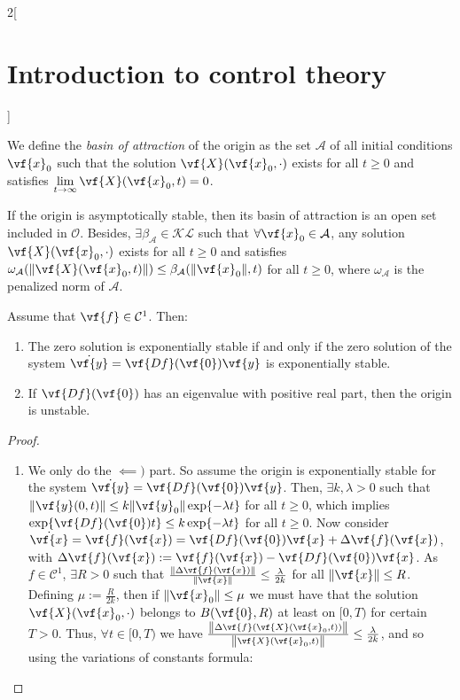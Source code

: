 \documentclass[../../../main_math.tex]{subfiles}
\begin{document}
\begin{multicols}{2}[\section{Introduction to control theory}]
\begin{definition}
    We define the \emph{basin of attraction} of the origin as the set $\mathcal{A}$ of all initial conditions $\vf{x}_0$ such that the solution $\vf{X}(\vf{x}_0, \cdot)$ exists for all $t\geq 0$ and satisfies $\displaystyle\lim_{t\to\infty}\vf{X}(\vf{x}_0, t)=0$.
  \end{definition}
  \begin{theorem}
    If the origin is asymptotically stable, then its basin of attraction is an open set included in $\mathcal{O}$. Besides, $\exists \beta_\mathcal{A}\in \mathcal{KL}$ such that $\forall \vf{x}_0\in\mathcal{A}$, any solution $\vf{X}(\vf{x}_0, \cdot)$ exists for all $t\geq 0$ and satisfies $\omega_{\mathcal{A}}(\norm{\vf{X}(\vf{x}_0, t)})\leq \beta_\mathcal{A}(\norm{\vf{x}_0}, t)$ for all $t\geq 0$, where $\omega_{\mathcal{A}}$ is the penalized norm of $\mathcal{A}$.
  \end{theorem}
  \begin{theorem}
    Assume that $\vf{f}\in\mathcal{C}^1$. Then:
    \begin{enumerate}
      \item The zero solution is exponentially stable if and only if the zero solution of the system $\dot{\vf{y}}=\vf{Df}(\vf{0}) \vf{y}$ is exponentially stable.
      \item If $\vf{Df}(\vf{0})$ has an eigenvalue with positive real part, then the origin is unstable.
    \end{enumerate}
  \end{theorem}
  \begin{proof}
    \begin{enumerate}
      \item We only do the $\impliedby)$ part. So assume the origin is exponentially stable for the system $\dot{\vf{y}}=\vf{Df}(\vf{0}) \vf{y}$. Then, $\exists k,\lambda>0$ such that $\norm{\vf{y}(0,t)}\leq k\norm{\vf{y}_0}\exp{-\lambda t}$ for all $t\geq 0$, which implies $\exp{\vf{Df}(\vf{0})t}\leq k\exp{-\lambda t}$ for all $t\geq 0$. Now consider $\dot{\vf{x}}=\vf{f}(\vf{x})=\vf{Df}(\vf{0})\vf{x}+\Delta\vf{f}(\vf{x})$, with $\Delta\vf{f}(\vf{x}):=\vf{f}(\vf{x})-\vf{Df}(\vf{0})\vf{x}$. As $f\in\mathcal{C}^1$, $\exists R>0$ such that $\frac{\norm{\Delta\vf{f}(\vf{x})}}{\norm{\vf{x}}}\leq \frac{\lambda}{2 k}$ for all $\norm{\vf{x}}\leq R$. Defining $\mu:= \frac{R}{2k}$, then if $\norm{\vf{x}_0}\leq \mu$ we must have that the solution $\vf{X}(\vf{x}_0, \cdot)$ belongs to $B(\vf{0},R)$ at least on $[0,T)$ for certain $T>0$. Thus, $\forall t\in [0,T)$ we have $\frac{\norm{\Delta \vf{f}(\vf{X}(\vf{x}_0, t))}}{\norm{\vf{X}(\vf{x}_0, t)}}\leq \frac{\lambda}{2k}$, and so using the variations of constants formula:

\end{enumerate}
\end{proof}
\end{multicols}
\end{document}
